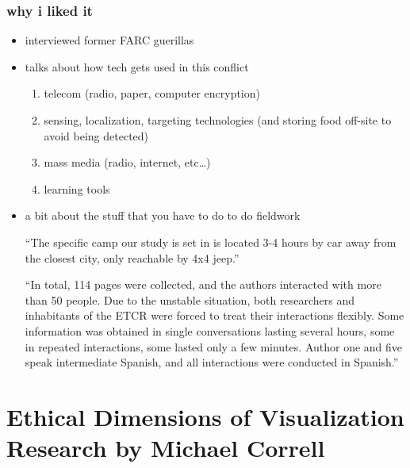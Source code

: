 \documentclass[aspectratio=169,10pt]{beamer} %
\begin{document}
\begin{frame}\frametitle{why i liked it}
    \begin{itemize}
      \item interviewed former FARC guerillas
      \item talks about how tech gets used in this conflict
      \begin{enumerate}
        \item telecom (radio, paper, computer encryption)
        \item sensing, localization, targeting technologies (and storing food off-site to avoid being detected)
        \item mass media (radio, internet, etc\dots)
        \item learning tools
      \end{enumerate}
      \item a bit about the stuff that you have to do to do fieldwork

      {\itshape
      \vspace{0.5em}

      ``The specific camp our study is set in is located 3-4 hours by car away from the closest city, only reachable by 4x4 jeep.''

      \vspace{0.5em}

      ``In total, 114 pages were collected, and the authors interacted with more than 50 people. Due to the unstable situation, both researchers and inhabitants of the ETCR were forced to treat their interactions flexibly. Some information was obtained in single conversations lasting several hours, some in repeated interactions, some lasted only a few minutes. Author one and five speak intermediate Spanish, and all interactions were conducted in Spanish.''
      }
    \end{itemize}
\end{frame}


\section[Ethical Dimensions of Visualization Research]{Ethical Dimensions of Visualization Research {\scriptsize \color{Black} by \textbf{Michael Correll}}}
\end{document}
